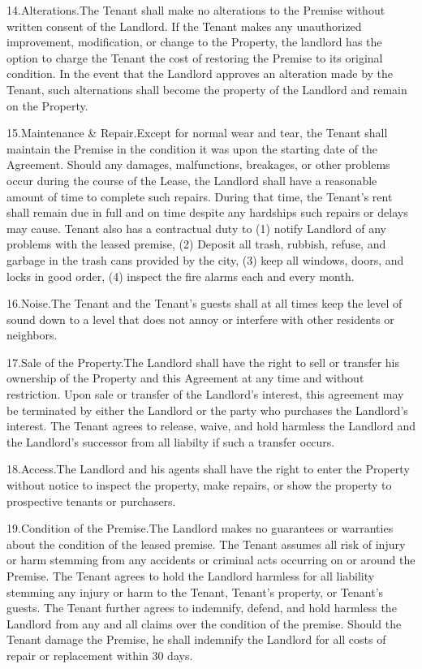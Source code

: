 14.\quad Alterations.\quad The Tenant shall make no alterations to the Premise without
written consent of the Landlord.  If the Tenant makes any unauthorized
improvement, modification, or change to the Property, the landlord has the
option to charge the Tenant the cost of restoring the Premise to its original
condition.  In the event that the Landlord approves an alteration made by the
Tenant, such alternations shall become the property of the Landlord and remain
on the Property.

15.\quad Maintenance \& Repair.\quad Except for normal wear and tear, the Tenant shall
maintain the Premise in the condition it was upon the starting date of the
Agreement.  Should any damages, malfunctions, breakages, or other problems
occur during the course of the Lease, the Landlord shall have a reasonable
amount of time to complete such repairs.  During that time, the Tenant's rent
shall remain due in full and on time despite any hardships such repairs or
delays may cause.  Tenant also has a contractual duty to (1) notify Landlord of
any problems with the leased premise, (2) Deposit all trash, rubbish, refuse,
and garbage in the trash cans provided by the city, (3) keep all windows,
doors, and locks in good order, (4) inspect the fire alarms each and every
month. 

16.\quad Noise.\quad The Tenant and the Tenant's guests shall at all times keep the
level of sound down to a level that does not annoy or interfere with other
residents or neighbors.  

17.\quad Sale of the Property.\quad The Landlord shall have the right to sell or transfer
his ownership of the Property and this Agreement at any time and without
restriction.  Upon sale or transfer of the Landlord's interest, this agreement
may be terminated by either the Landlord or the party who purchases the
Landlord's interest.  The Tenant agrees to release, waive, and hold harmless
the Landlord and the Landlord's successor from all liabilty if such a transfer
occurs. 

18.\quad Access.\quad The Landlord and his agents shall have the right to enter the
Property without notice to inspect the property, make repairs, or show the
property to prospective tenants or purchasers.

19.\quad Condition of the Premise.\quad The Landlord makes no guarantees or warranties
about the condition of the leased premise.  The Tenant assumes all risk of
injury or harm stemming from any accidents or criminal acts occurring on or
around the Premise.  The Tenant agrees to hold the Landlord harmless for all
liability stemming any injury or harm to the Tenant, Tenant's property, or
Tenant's guests.  The Tenant further agrees to indemnify, defend, and hold
harmless the Landlord from any and all claims over the condition of the
premise.  Should the Tenant damage the Premise, he shall indemnify the Landlord
for all costs of repair or replacement within 30 days.

